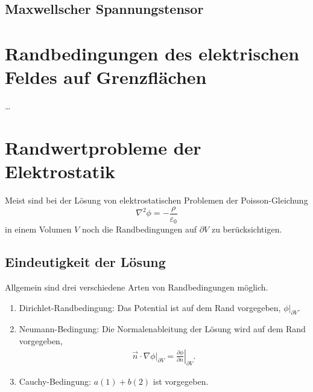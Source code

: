 \subsection{Maxwellscher Spannungstensor\label{sec:maxwellscher_spannungstensor}}

\section{Randbedingungen des elektrischen Feldes auf Grenzflächen\label{sec:randbedingungen_auf_grenzflaechen}}

 {\ldots}



\section{Randwertprobleme der Elektrostatik}

Meist sind bei der Lösung von elektrostatischen Problemen der Poisson-Gleichung
\begin{equation*}
	\nabla ^{2}\phi =-\frac{\rho }{\varepsilon _{0}}
\end{equation*}
in einem Volumen $V$ noch die Randbedingungen auf $\partial V$ zu berücksichtigen.



\subsection{Eindeutigkeit der Lösung}

Allgemein sind drei verschiedene Arten von Randbedingungen möglich.

\begin{enumerate}
	\item Dirichlet-Randbedingung: Das Potential ist auf dem Rand vorgegeben, $\left.\hspace{0pt}\phi \right| _{\partial V}$.

	\item Neumann-Bedingung: Die Normalenableitung der Lösung wird auf dem Rand vorgegeben,
	      \begin{align*}
		      \vec {n}\cdot \left.\nabla \phi \right| _{\partial V}=\left.\frac{\partial \phi }{\partial n}\right| _{\partial V}.
	      \end{align*}


	\item Cauchy-Bedingung: $a\left(1\right)+b\left(2\right)$ ist vorgegeben.
\end{enumerate}

